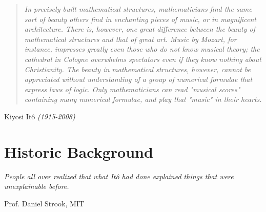 \documentclass[11pt,a4paper, final]{article}
\begin{document}
\newpage
\thispagestyle{empty}
\vspace*{\fill} 
\begin{quote} 
 
\textit{ \Large In precisely built mathematical structures, mathematicians find the same sort of beauty others find in enchanting pieces of music, or in magnificent architecture. There is, however, one great difference between the beauty of mathematical structures and that of great art. Music by Mozart, for instance, impresses greatly even those who do not know musical theory; the cathedral in Cologne overwhelms spectators even if they know nothing about Christianity. The beauty in mathematical structures, however, cannot be appreciated without understanding of a group of numerical formulae that express laws of logic. Only mathematicians can read "musical scores" containing many numerical formulae, and play that "music" in their hearts.}
\end{quote}
\hfill Kiyosi Itô \textit{(1915-2008)}
\vspace*{\fill}



\newpage
\thispagestyle{empty}
\tableofcontents
\newpage
\section{Historic Background}



\epigraph{\textit{People all over realized that what Itô had done explained things that were unexplainable before.}}{Prof. Daniel Strook, MIT}
\end{document}
